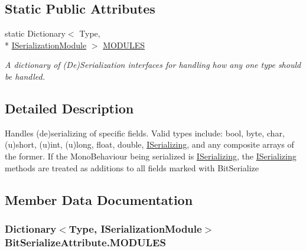 \subsection*{Static Public Attributes}
\begin{DoxyCompactItemize}
\item 
static Dictionary$<$ Type, \\*
\hyperlink{interface_bit_serialize_attribute_1_1_i_serialization_module}{I\-Serialization\-Module} $>$ \hyperlink{class_bit_serialize_attribute_ae713451406fed4a03f33416a583eeb1e}{M\-O\-D\-U\-L\-E\-S}
\begin{DoxyCompactList}\small\item\em A dictionary of (De)Serialization interfaces for handling how any one type should be handled. \end{DoxyCompactList}\end{DoxyCompactItemize}


\subsection{Detailed Description}
Handles (de)serializing of specific fields. Valid types include\-: bool, byte, char, (u)short, (u)int, (u)long, float, double, \hyperlink{interface_i_serializing}{I\-Serializing}, and any composite arrays of the former. If the Mono\-Behaviour being serialized is \hyperlink{interface_i_serializing}{I\-Serializing}, the \hyperlink{interface_i_serializing}{I\-Serializing} methods are treated as additions to all fields marked with Bit\-Serialize 



\subsection{Member Data Documentation}
\hypertarget{class_bit_serialize_attribute_ae713451406fed4a03f33416a583eeb1e}{
\subsubsection[{M\-O\-D\-U\-L\-E\-S}]{\setlength{\rightskip}{0pt plus 5cm}Dictionary$<$Type, {\bf I\-Serialization\-Module}$>$ Bit\-Serialize\-Attribute.\-M\-O\-D\-U\-L\-E\-S\hspace{0.3cm}{\ttfamily [static]}}}\label{class_bit_serialize_attribute_ae713451406fed4a03f33416a583eeb1e}


